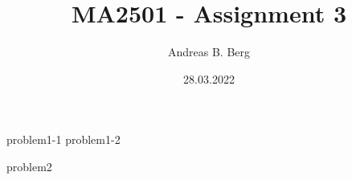 \documentclass{article}
\begin{document}
\mainmatter

\title{MA2501 - Assignment 3}
\author{Andreas B. Berg}
\date{28.03.2022}
\maketitle
\thispagestyle{fancy}

{problem1-1}
\pagebreak
{problem1-2}

{problem2}


\end{document}

